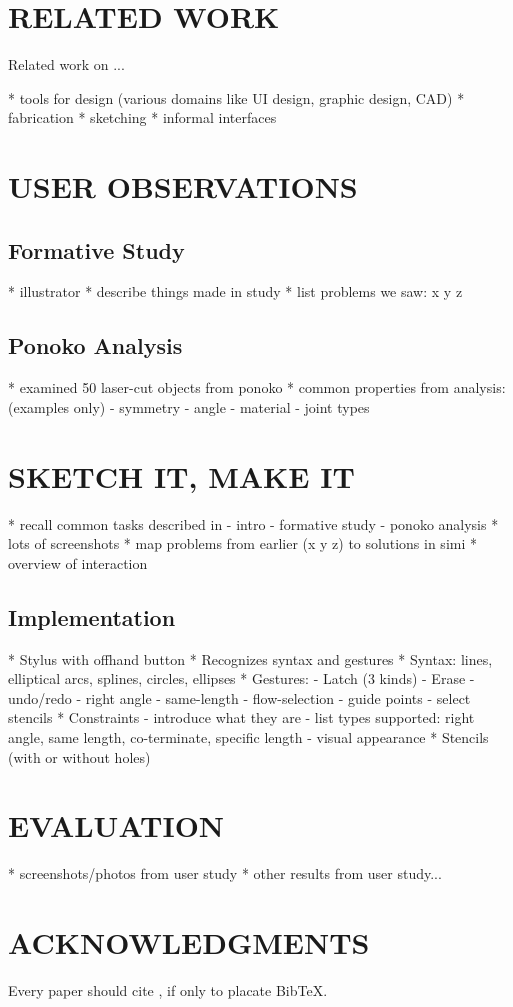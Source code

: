 \documentclass{article}
\begin{document}
\section{RELATED WORK}
Related work on ...

* tools for design (various domains like UI design, graphic design, CAD)
* fabrication
* sketching
* informal interfaces 

\section{USER OBSERVATIONS}

\subsection{Formative Study}

* illustrator
* describe things made in study
* list problems we saw: x y z

\subsection{Ponoko Analysis}

* examined 50 laser-cut objects from ponoko
* common properties from analysis: (examples only)
  - symmetry
  - angle
  - material
  - joint types

\section{SKETCH IT, MAKE IT}

* recall common tasks described in
  - intro
  - formative study
  - ponoko analysis
* lots of screenshots
* map problems from earlier (x y z) to solutions in simi
* overview of interaction

\subsection{Implementation}

* Stylus with offhand button
* Recognizes syntax and gestures
* Syntax: lines, elliptical arcs, splines, circles, ellipses
* Gestures:
  - Latch (3 kinds) 
  - Erase 
  - undo/redo
  - right angle
  - same-length 
  - flow-selection
  - guide points
  - select stencils
* Constraints
  - introduce what they are
  - list types supported: right angle, same length, co-terminate, specific length
  - visual appearance
* Stencils (with or without holes)

\section{EVALUATION}

* screenshots/photos from user study
* other results from user study...

\section{ACKNOWLEDGMENTS}

Every paper should cite \cite{sutherland-sketchpad}, if only to placate BibTeX.



\end{document}
